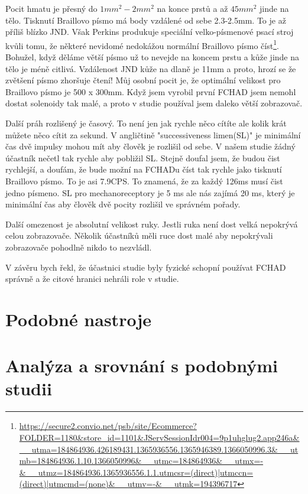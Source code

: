 Pocit hmatu je přesný do ${}1mm^2 - 2mm^2$ na konce prstů a až ${}45mm^2$ jinde na tělo.  Tisknutí Braillovo písmo má body vzdálené od sebe 2.3-2.5mm\citep{brailleautority}. To je až příliš blízko JND.  Však Perkins produkuje speciální velko-písmenové psací stroj kvůli tomu, že některé nevidomé nedokážou normální Braillovo písmo číst\footnote{\url{https://secure2.convio.net/psb/site/Ecommerce?FOLDER=1180&store_id=1101&JServSessionIdr004=9p1uhglug2.app246a&__utma=184864936.426189431.1365936556.1365946389.1366050996.3&__utmb=184864936.1.10.1366050996&__utmc=184864936&__utmx=-&__utmz=184864936.1365936556.1.1.utmcsr=(direct)|utmccn=(direct)|utmcmd=(none)&__utmv=-&__utmk=194396717}}.  Bohužel, když děláme větší písmo už to nevejde na koncem prstu a kůže jinde na tělo je méně citlivá.  Vzdálenost JND kůže na dlaně je 11mm a proto, hrozí se že zvětšení písmo zhoršuje čtení! Můj osobní pocit je, že optimální velikost pro Braillovo písmo je 500 x 300mm.  Když jsem vyrobil první FCHAD jsem nemohl dostat solenoidy tak malé, a proto v studie používal jsem daleko větší zobrazovač\citep[str. 30-32]{nielsen2008gesture}.

Další práh rozlišený je časový.  To není jen jak rychle něco cítíte ale kolik krát můžete něco cítit za sekund.  V angličtině "successiveness limen(SL)" je minimální čas dvě impulsy mohou mít aby člověk je rozlišil od sebe.  V našem studie žádný účastník nečetl tak rychle aby pobližil SL.  Stejně doufal jsem, že budou čist rychlejší, a doufám, že bude možní na FCHADu číst tak rychle jako tisknutí Braillovo písmo.  To je asi 7.9CPS\citep{wetzel2006studies}.  To znamená, že za každý 126ms musí čist jedno písmeno.  SL pro mechanoreceptory je 5 ms ale nás zajímá 20 ms, který je minimální čas aby člověk dvě pocity rozlišil ve správném pořady\citep[str. 32]{nielsen2008gesture}.

Další omezenost je absolutní velikost ruky.  Jestli ruka není dost velká nepokrývá celou zobrazovače.  Několik účastníků měli ruce dost malé aby nepokrývali zobrazovače pohodlně nikdo to nezvládl.

V závěru bych řekl, že účastnici studie byly fyzické schopní používat FCHAD správně a že citové hranici nehráli role v studie.

\section{Podobné nastroje}

\section{Analýza a srovnání s podobnými studii}


